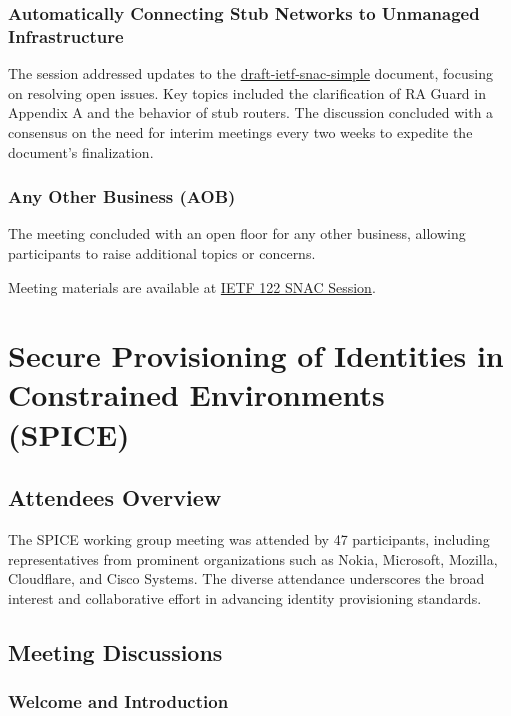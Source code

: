 \documentclass{article}
\begin{document}
\subsubsection{Automatically Connecting Stub Networks to Unmanaged Infrastructure}
The session addressed updates to the \href{https://datatracker.ietf.org/doc/draft-ietf-snac-simple/}{draft-ietf-snac-simple} document, focusing on resolving open issues. Key topics included the clarification of RA Guard in Appendix A and the behavior of stub routers. The discussion concluded with a consensus on the need for interim meetings every two weeks to expedite the document's finalization.

\subsubsection{Any Other Business (AOB)}
The meeting concluded with an open floor for any other business, allowing participants to raise additional topics or concerns.

Meeting materials are available at \href{https://meetings.conf.meetecho.com/ietf122/?session=34032}{IETF 122 SNAC Session}.



\newpage

\section{Secure Provisioning of Identities in Constrained Environments (SPICE)}

\subsection{Attendees Overview}

The SPICE working group meeting was attended by 47 participants, including representatives from prominent organizations such as Nokia, Microsoft, Mozilla, Cloudflare, and Cisco Systems. The diverse attendance underscores the broad interest and collaborative effort in advancing identity provisioning standards.

\subsection{Meeting Discussions}

\subsubsection{Welcome and Introduction}
\end{document}
